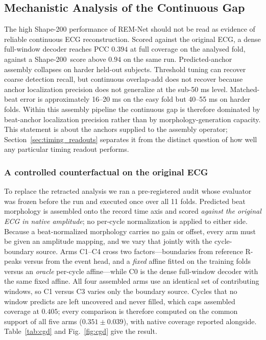 \documentclass[lettersize,journal]{IEEEtran}
\newcommand{\remnet}{REM-Net\xspace}
\newcommand{\shape}{Shape-200\xspace}
\begin{document}
\subsection{Mechanistic Analysis of the Continuous Gap}
\label{sec:continuous}
The high \shape performance of \remnet should not be read as evidence of reliable continuous ECG reconstruction. Scored against the original ECG, a dense full-window decoder reaches PCC $0.394$ at full coverage on the analysed fold, against a \shape\ score above $0.94$ on the same run. Predicted-anchor assembly collapses on harder held-out subjects. Threshold tuning can recover coarse detection recall, but continuous overlap-add does not recover because anchor localization precision does not generalize at the sub-50 ms level. Matched-beat error is approximately 16--20 ms on the easy fold but 40--55 ms on harder folds. Within this assembly pipeline the continuous gap is therefore dominated by beat-anchor localization precision rather than by morphology-generation capacity. This statement is about the anchors supplied to the assembly operator; Section~\ref{sec:timing_readouts} separates it from the distinct question of how well any particular timing readout performs.
\subsubsection{A controlled counterfactual on the original ECG}
\label{sec:cgd}
To replace the retracted analysis we ran a pre-registered audit whose evaluator was frozen before the run and executed once over all 11 folds. Predicted beat morphology is assembled onto the record time axis and scored \emph{against the original ECG in native amplitude}; no per-cycle normalization is applied to either side. Because a beat-normalized morphology carries no gain or offset, every arm must be given an amplitude mapping, and we vary that jointly with the cycle-boundary source. Arms C1--C4 cross two factors---boundaries from reference R-peaks versus from the event head, and a \emph{fixed} affine fitted on the training folds versus an \emph{oracle} per-cycle affine---while C0 is the dense full-window decoder with the same fixed affine. All four assembled arms use an identical set of contributing windows, so C1 versus C3 varies only the boundary source. Cycles that no window predicts are left uncovered and never filled, which caps assembled coverage at $0.405$; every comparison is therefore computed on the common support of all five arms ($0.351 \pm 0.039$), with native coverage reported alongside. Table~\ref{tab:cgd} and Fig.~\ref{fig:cgd} give the result.
\end{document}
